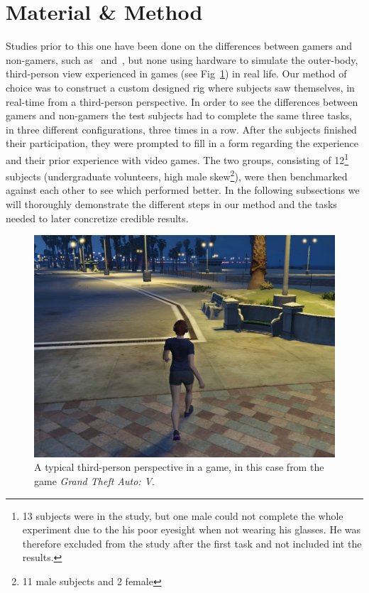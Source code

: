 \documentclass[runningheads,a4paper,oribibl]{llncs}
\begin{document}
\section{Material \& Method}
Studies prior to this one have been done on the differences between gamers and non-gamers, such as~\cite{schmierbach2011exploring} and~\cite{gong2015enhanced}, but none using hardware to simulate the outer-body, third-person view experienced in games (see Fig~\ref{fig:GTAIV}) in real life. Our method of choice was to construct a custom designed rig where subjects saw themselves, in real-time from a third-person perspective. In order to see the differences between gamers and non-gamers the test subjects had to complete the same three tasks, in three different configurations, three times in a row. After the subjects finished their participation, they were prompted to fill in a form regarding the experience and their prior experience with video games. The two groups, consisting of 12\footnote{13 subjects were in the study, but one male could not complete the whole experiment due to the his poor eyesight when not wearing his glasses. He was therefore excluded from the study after the first task and not included int the results.} subjects (undergraduate volunteers, high male skew\footnote{11 male subjects and 2 female}), were then benchmarked against each other to see which performed better. In the following subsections we will thoroughly demonstrate the different steps in our method and the tasks needed to later concretize credible results.









\begin{figure}
   \centering
   \includegraphics[width=\textwidth]{ExternalMaterial/GTA}
   \caption{A typical third-person perspective in a game, in this case from the game \emph{Grand Theft Auto: V}. \label{fig:GTAIV}}
\end{figure}
\end{document}
